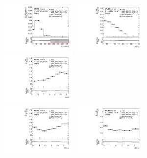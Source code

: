 \begin{figure}[ht]
  \centering
  \includegraphics[width=0.33\textwidth]{figures/diff_xsec/normalized-unfolded-distributions/tty_total_dilep/DL_tty_total_ptll_unfolded_normalized.pdf}%
  \includegraphics[width=0.33\textwidth]{figures/diff_xsec/normalized-unfolded-distributions/tty_total_dilep/DL_tty_total_dEtall_unfolded_normalized.pdf}%
  \includegraphics[width=0.33\textwidth]{figures/diff_xsec/normalized-unfolded-distributions/tty_total_dilep/DL_tty_total_dPhill_unfolded_normalized.pdf}\\
  \includegraphics[width=0.33\textwidth]{figures/diff_xsec/normalized-unfolded-distributions/tty_total_dilep/DL_tty_total_drphl1_unfolded_normalized.pdf}%
  \includegraphics[width=0.33\textwidth]{figures/diff_xsec/normalized-unfolded-distributions/tty_total_dilep/DL_tty_total_drphl2_unfolded_normalized.pdf}%

\end{figure}
